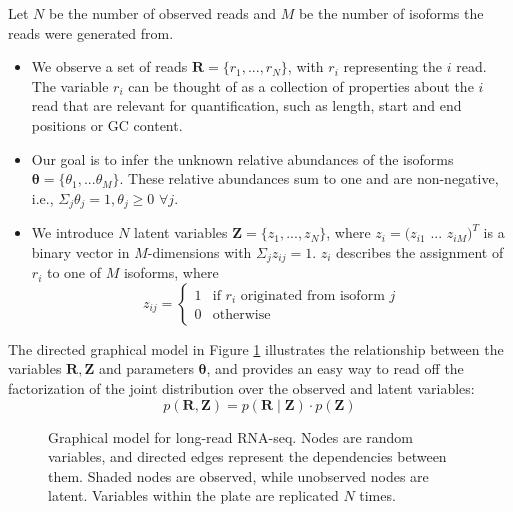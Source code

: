 Let $N$ be the number of observed reads and $M$ be the number of isoforms the reads were generated from. 
\begin{itemize}
    \item We observe a set of reads $\bm{R}=\{r_1,...,r_N\}$, with $r_i$ representing the $i$ read. The variable $r_i$ can be thought of as a collection of properties about the $i$ read that are relevant for quantification, such as length, start and end positions or GC content.
    \item Our goal is to infer the unknown relative abundances of the isoforms $\bm{\theta}=\{\theta_1,...\theta_M\}$. These relative abundances sum to one and are non-negative, i.e., $\Sigma_j\theta_j=1, \theta_j\geq0$ $\forall j$. 
    \item We introduce $N$ latent variables $\bm{Z}=\{z_1,...,z_N\}$, where $z_i=(z_{i1}$ $...$ $z_{iM})^T$ is a binary vector in $M$-dimensions with $\Sigma_jz_{ij}=1$. $z_i$ describes the assignment of $r_i$ to one of $M$ isoforms, where
    \begin{equation}
        z_{ij} = 
        \begin{cases}
        1 & \text{if } r_i \text{ originated from isoform } j\\
        0 & \text{otherwise }
        \end{cases}
    \end{equation}
\end{itemize} 
The directed graphical model in Figure \ref{fig:graphical-model-1} illustrates the relationship between the variables $\bm{R}, \bm{Z}$ and parameters $\bm{\theta}$, and provides an easy way to read off the factorization of the joint distribution over the observed and latent variables:
\begin{equation}
    p(\bm{R},\bm{Z})=p(\bm{R}\mid\bm{Z})\cdot p(\bm{Z})\label{eq:joint-dist}
\end{equation}
\begin{figure}[H]
    \centering
    \caption[Graphical model for long-read RNA-seq]{Graphical model for long-read RNA-seq. Nodes are random variables, and directed edges represent the dependencies between them. Shaded nodes are observed, while unobserved nodes are latent. Variables within the plate are replicated $N$ times.}
    \label{fig:graphical-model-1}
\end{figure}

